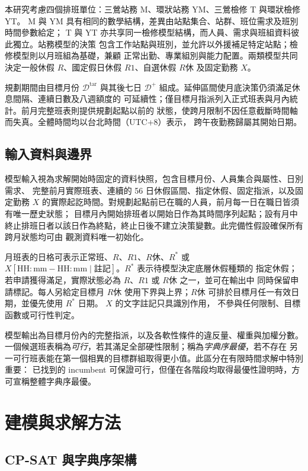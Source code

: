 \documentclass[a4paper,12pt]{article}
\begin{document}
本研究考慮四個排班單位：三鶯站務 M、環狀站務 YM、三鶯檢修 T 與環狀檢修 YT。
M 與 YM 具有相同的數學結構，差異由站點集合、站群、班位需求及班別時間參數給定；
T 與 YT 亦共享同一檢修模型結構，而人員、需求與班組資料彼此獨立。站務模型的決策
包含工作站點與班別，並允許以外援補足特定站點；檢修模型則以月班組為基礎，兼顧
正常出勤、專業組別與能力配置。兩類模型共同決定一般休假 \(R\)、國定假日休假
\(R1\)、自選休假 \(R休\) 及固定勤務 \(X\)。

規劃期間由目標月份 \(\mathcal D^{\mathrm{tar}}\) 與其後七日
\(\mathcal D^+\) 組成。延伸區間使月底決策仍須滿足休息間隔、連續日數及八週額度的
可延續性；僅目標月指派列入正式班表與月內統計。前月完整班表則提供規劃起點以前的
狀態，使跨月限制不因任意截斷時間軸而失真。全體時間均以台北時間（UTC+8）表示，
跨午夜勤務歸屬其開始日期。

\subsection{輸入資料與邊界}

模型輸入視為求解開始時固定的資料快照，包含目標月份、人員集合與屬性、日別需求、
完整前月實際班表、連續的 56 日休假區間、指定休假、固定指派，以及固定勤務 \(X\)
的實際起訖時間。對規劃起點前已在職的人員，前月每一日在職日皆須有唯一歷史狀態；
目標月內開始排班者以開始日作為其時間序列起點；設有月中終止排班日者以該日作為終點，終止日後不建立決策變數。此完備性假設確保所有跨月狀態均可由
觀測資料唯一初始化。

月班表的日格可表示正常班、\(R\)、\(R1\)、\(R休\)、\(R^*\) 或
\(X[\mathrm{HH{:}mm-HH{:}mm}\mid\text{註記}]\)。\(R^*\) 表示待模型決定底層休假種類的
指定休假；若申請獲得滿足，實際狀態必為 \(R\)、\(R1\) 或 \(R休\) 之一，並可在輸出中
同時保留申請標記。每人另給定目標月 \(R休\) 使用下界與上界；\(R休\) 可排於目標月任一有效日期，並優先使用 \(R^*\) 日期。
\(X\) 的文字註記只具識別作用，
不參與任何限制、目標函數或可行性判定。

模型輸出為目標月份內的完整指派，以及各軟性條件的違反量、權重與加權分數。
一個候選班表稱為\emph{可行}，若其滿足全部硬性限制；稱為\emph{字典序最優}，若不存在
另一可行班表能在第一個相異的目標群組取得更小值。此區分在有限時間求解中特別重要：
已找到的 incumbent 可保證可行，但僅在各階段均取得最優性證明時，方可宣稱整體字典序最優。

\section{建模與求解方法}

\subsection{CP-SAT 與字典序架構}
\end{document}

